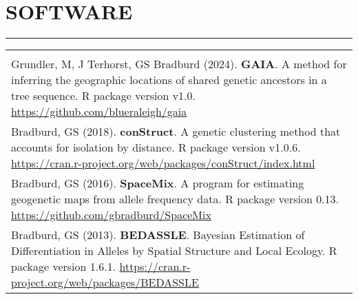 \documentclass{gbcv}
\begin{document}
\section*{SOFTWARE}
\vspace{-0.6cm}
\rule{470pt}{0.4pt}
\begin{tabular}{>{\everypar{\hangindent1cm}}p{}}
\hfill\\
%
Grundler, M, J Terhorst, GS Bradburd (2024). \textbf{GAIA}. A method for inferring the geographic locations of 
shared genetic ancestors in a tree sequence. R package version v1.0.
\href{https://github.com/blueraleigh/gaia}{https://github.com/blueraleigh/gaia}\\
%
\vspace{-0.1cm}
%
Bradburd, GS (2018). \textbf{conStruct}. A genetic clustering method that accounts for isolation by distance. R package version v1.0.6.
\href{https://cran.r-project.org/web/packages/conStruct/index.html}{https://cran.r-project.org/web/packages/conStruct/index.html}\\
%
\vspace{-0.1cm}
%
Bradburd, GS (2016). \textbf{SpaceMix}. A program for estimating geogenetic maps from allele frequency data. R package version 0.13.
\href{https://github.com/gbradburd/SpaceMix}{https://github.com/gbradburd/SpaceMix}\\
%
\vspace{-0.1cm}
%
Bradburd, GS (2013). \textbf{BEDASSLE}. Bayesian Estimation of Differentiation in Alleles by Spatial Structure and Local Ecology. 
R package version 1.6.1. \href{https://cran.r-project.org/web/packages/BEDASSLE}{https://cran.r-project.org/web/packages/BEDASSLE}\\
%
\end{tabular}
%
\newpage
\end{document}
